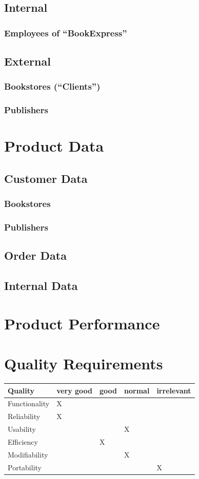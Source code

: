 \documentclass[11pt,a4paper,oneside,svgnames,draft]{report}
\begin{document}
\section{Internal}
\subsection{Employees of ``BookExpress''}

\section{External}
\subsection{Bookstores (``Clients'')}
\subsection{Publishers}

\chapter{Product Data}
\section{Customer Data}
\subsection{Bookstores}
\subsection{Publishers}
\section{Order Data}
\section{Internal Data}

\chapter{Product Performance}
\chapter{Quality Requirements}
\begin{table}[h!]
 \begin{tabular}{lllll}
  \hline
  Quality & very good & good & normal & irrelevant \\
  \hline
  Functionality & X & & & \\
  Reliability & X & & & \\
  Usability & & & X & \\
  Efficiency & & X & & \\
  Modifiability & & & X & \\
  Portability & & & & X \\
  \hline
 \end{tabular}
\end{table}
\end{document}
